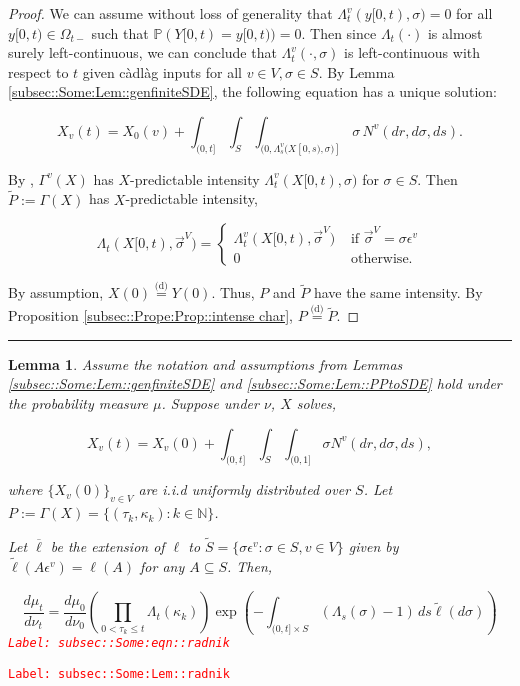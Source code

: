\documentclass[12pt]{article}
\newcommand{\mb}{\mathbb}
\newcommand{\ov}{\overline}
\newcommand{\te}{\text}
\newcommand{\ep}{\epsilon}
\newcommand{\tr}{\textcolor{red}}
\newcommand{\labe}[1]{\tr{\texttt{Label: #1}}}
\newcommand{\ind}{\hspace{24pt}}
\newcommand{\lin}{\rule{\linewidth}{0.4 pt}}
\newcommand{\pr}{\mb{P}}							%
\newcommand{\deq}{\overset{\text{(d)}}{=}}			%
\newcommand{\defeq}{:=}								%
\renewcommand{\v}{v}							%
\renewcommand{\S}{S}							%
\newcommand{\s}{\sigma}							%
\newcommand{\sv}{\vec{\s}}						%
\newcommand{\ev}{\ep}							%
\renewcommand{\t}{t}							%
\newcommand{\sset}{\Omega}						%
\renewcommand{\tt}{s}							%
\newcommand{\X}{X}								%
\newcommand{\vind}[1]{^{#1}}					%
\newcommand{\vsi}[1]{^{#1}}						%
\newcommand{\cind}[1]{_{#1}}					%
\newcommand{\tp}[1]{(#1)}						%
\newcommand{\tip}[1]{#1}						%
\newcommand{\ts}[1]{_{#1}}						%
\newcommand{\poiss}{N}							%
\newcommand{\Sm}{\ell}							%
\renewcommand{\r}{r}							%
\newcommand{\alt}[1]{\widetilde{#1}}			%
\newcommand{\indx}[1]{_{#1}}					%
\newcommand{\m}{\mu}							%
\newcommand{\mm}{\nu}							%
\newcommand{\XX}{Y}								%
\newcommand{\rt}{\tau}							%
\renewcommand{\it}{k}							%
\newcommand{\pmap}{\Gamma}						%
\renewcommand{\mark}{\kappa}					%
\newcommand{\rp}{P}								%
\newcommand{\typset}{A}							%
\newcommand{\ratee}{\Lambda}					%
\newcommand{\xx}{y}								%
\newtheorem{lem}[thms]{Lemma}
\begin{document}
\begin{proof}

We can assume without loss of generality that \(\ratee\ts{\t}\vind{\v}(\xx\tip{[0,\t)},\s) = 0\) for all \(\xx\tip{[0,\t)}\in \sset\ts{\t-}\) such that \(\pr(\XX\tip{[0,\t)} = \xx\tip{[0,\t)}) = 0\). Then since \(\ratee\ts{\t}(\cdot)\) is almost surely left-continuous, we can conclude that \(\ratee\ts{\t}\vind{\v}(\cdot,\s)\) is left-continuous with respect to \(\t\) given c\`adl\`ag inputs for all \(\v\in V,\s\in\S\). By Lemma \ref{subsec::Some:Lem::genfiniteSDE}, the following equation has a unique solution:

\[\X\cind{\v}\tp{\t} = \X\cind{0}\tp{\v} + \int_{(0,\t]}\int_\S\int_{(0,\ratee\ts{\tt}\vind{\v}(\X\tip{[0,\tt)},\s)]}  \s\,\poiss\vind{\v}(d\r,d\s,d\tt).\]

By \cite[Exercise 14.7.1]{DalVer08}, \(\pmap\vind{\v}(\X)\) has \(\X\)-predictable intensity \(\ratee\ts{\t}\vind{\v}(\X\tip{[0,\t)},\s)\) for \(\s \in \S\). Then \(\alt{\rp} \defeq \pmap(\X)\) has \(\X\)-predictable intensity,

\[\ratee\ts{\t}(\X\tip{[0,\t)},\sv\vsi{V}) = \begin{cases}
\ratee\ts{\t}\vind{\v}(\X\tip{[0,\t)},\sv\vsi{V}) &\te{ if } \sv\vsi{V} = \s\ev\vind{\v}\\
0&\te{ otherwise.}
\end{cases}\]

By assumption, \(\X\tp{0} \deq \XX\tp{0}\). Thus, \(\rp\) and \(\alt{\rp}\) have the same intensity. By Proposition \ref{subsec::Prope:Prop::intense char}, \(\rp \deq \alt{\rp}\).
\end{proof}
\lin

\begin{lem}
Assume the notation and assumptions from Lemmas \ref{subsec::Some:Lem::genfiniteSDE} and \ref{subsec::Some:Lem::PPtoSDE} hold under the probability measure \(\m\). Suppose under \(\mm\), \(\X\) solves,

\[\X\cind{\v}\tp{\t} = \X\cind{\v}\tp{0} +\int_{(0,\t]}\int_\S\int_{(0,1]} \s \poiss\vind{\v}(d\r,d\s,d\tt),\]

where \(\{\X\cind{\v}\tp{0}\}_{\v \in V}\) are i.i.d uniformly distributed over \(\S\). Let \(\rp \defeq \pmap(\X) = \{(\rt\indx{\it},\mark\indx{\it}):\it\in \mb{N}\}\).

\ind Let \(\ov{\ell}\) be the extension of \(\Sm\) to \(\alt{\S} = \{\s\ev\vind{\v}: \s \in \S, \v \in V\}\) given by \(\alt{\Sm}(\typset\ev\vind{\v}) = \Sm(\typset)\) for any \(\typset \subseteq \S\). Then,

\begin{equation}
\frac{d\m\ts{\t}}{d\mm\ts{\t}}= \frac{d\m\ts{0}}{d\mm\ts{0}}\left(\prod_{0< \rt\indx{\it}\leq \t} \ratee\ts{\t}(\mark\indx{\it})\right)\exp\left(-\int_{(0,\t]\times \S} (\ratee\ts{\tt}(\s) - 1)\,d\tt\alt{\Sm}(d\s)\right)
\label{subsec::Some:eqn::radnik}
\end{equation}
\labe{subsec::Some:eqn::radnik}
\label{subsec::Some:Lem::radnik}
\end{lem}
\labe{subsec::Some:Lem::radnik}
\end{document}
